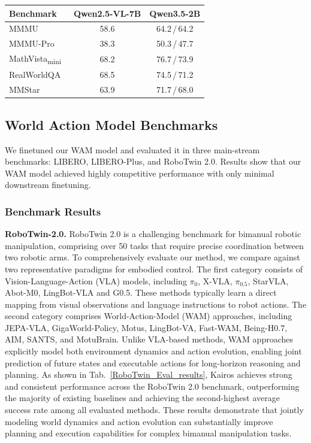 \begin{table}[t]
\begin{minipage}[t]{0.48\textwidth}
{\begin{tabular}{l c c}
\toprule
\multirow{1}{*}{\textbf{Benchmark}} & \textbf{Qwen2.5-VL-7B} & \textbf{Qwen3.5-2B} \\
\midrule
MMMU~\cite{mmmu}            & 58.6 & 64.2\,/\,64.2 \\
MMMU-Pro~\cite{mmupro}        & 38.3 & 50.3\,/\,47.7 \\
MathVista\textsubscript{mini}~\cite{mathvista} & 68.2 & 76.7\,/\,73.9 \\
RealWorldQA~\cite{realworldqa}     & 68.5 & 74.5\,/\,71.2 \\
MMStar~\cite{mmstar}          & 63.9 & 71.7\,/\,68.0 \\
\bottomrule
\end{tabular}%
}
\end{minipage}
\end{table}


\subsection{World Action Model Benchmarks}
We finetuned our WAM model and evaluated it in three main-stream benchmarks: LIBERO, LIBERO-Plus, and RoboTwin 2.0. Results show that our WAM model achieved highly competitive performance with only minimal downstream finetuning.

\subsubsection{Benchmark Results}

\textbf{RoboTwin-2.0.} 
RoboTwin 2.0 \citep{chen2025robotwin} is a challenging benchmark for bimanual robotic manipulation, comprising over 50 tasks that require precise coordination between two robotic arms. To comprehensively evaluate our method, we compare against two representative paradigms for embodied control.
The first category consists of Vision-Language-Action (VLA) models, including $\pi_0$, X-VLA, $\pi_{0.5}$, StarVLA, Abot-M0, LingBot-VLA and G0.5. These methods typically learn a direct mapping from visual observations and language instructions to robot actions. The second category comprises World-Action-Model (WAM) approaches, including JEPA-VLA, GigaWorld-Policy, Motus, LingBot-VA, Fast-WAM, Being-H0.7, AIM, SANTS, and MotuBrain. Unlike VLA-based methods, WAM approaches explicitly model both environment dynamics and action evolution, enabling joint prediction of future states and executable actions for long-horizon reasoning and planning.
As shown in Tab.~\ref{RoboTwin_Eval_results}, Kairos achieves strong and consistent performance across the RoboTwin 2.0 benchmark, outperforming the majority of existing baselines and achieving the second-highest average success rate among all evaluated methods. These results demonstrate that jointly modeling world dynamics and action evolution can substantially improve planning and execution capabilities for complex bimanual manipulation tasks.

